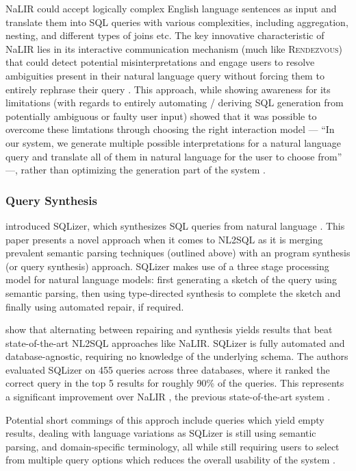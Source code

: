\documentclass{article}
\begin{document}
NaLIR could accept logically complex English language sentences as input and translate them into SQL queries with various 
complexities, including aggregation, nesting, and different types of joins etc. The key innovative characteristic of 
NaLIR lies in its interactive communication mechanism (much like \textsc{Rendezvous}) that could detect potential 
misinterpretations and engage users to resolve ambiguities present in their natural language query without forcing them
to entirely rephrase their query \cite{NALIR}. This approach, while showing awareness for its limitations (with regards
to entirely automating / deriving SQL generation from potentially ambiguous or faulty user input) showed that it was 
possible to overcome these limtations through choosing the right interaction model — ``In our system, we generate
multiple possible interpretations for a natural language query and translate all of them in natural language for the
user to choose from'' —, rather than optimizing the generation part of the system \cite{NALIR}.

\subsubsection{Query Synthesis}

\cite{SQLizer} introduced SQLizer, which synthesizes SQL queries from natural language \citep{SQLizer}. This paper
presents a novel approach when it comes to NL2SQL as it is merging prevalent semantic parsing techniques (outlined above)
with an program synthesis (or query synthesis) approach. SQLizer makes use of a three stage processing model for 
natural language models: first generating a sketch of the query using semantic parsing, then using type-directed
synthesis to complete the sketch and finally using automated repair, if required. 

\citeauthor*{SQLizer} show that alternating between repairing and synthesis yields results that beat state-of-the-art
NL2SQL approaches like NaLIR. SQLizer is fully automated and database-agnostic, requiring no knowledge of the underlying
schema. The authors evaluated SQLizer on 455 queries across three databases, where it ranked the correct query in the
top 5 results for roughly 90\% of the queries. This represents a significant improvement over NaLIR \citep{NALIR},
the previous state-of-the-art system \citep{SQLizer}.

Potential short commings of this approch include queries which yield empty results, dealing with language variations
as SQLizer is still using semantic parsing, and domain-specific terminology, all while still requiring users
to select from multiple query options which reduces the overall usability of the system \citep[p.22-23]{SQLizer}.
\end{document}
